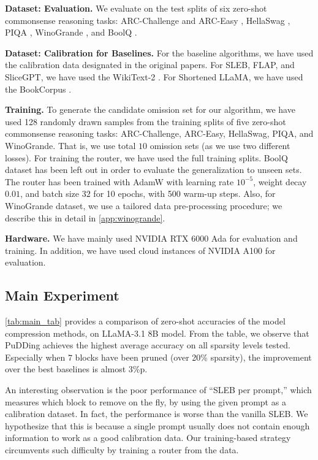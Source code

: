 \textbf{Dataset: Evaluation.} We evaluate on the test splits of six zero-shot commonsense reasoning tasks: ARC-Challenge and ARC-Easy \citep{clark2018arc}, HellaSwag \citep{zellers2019hellaswag}, PIQA \citep{bisk2020piqa}, WinoGrande \citep{sakaguchi2021winogrande}, and BoolQ \citep{clark2019boolq}.

\textbf{Dataset: Calibration for Baselines.} For the baseline algorithms, we have used the calibration data designated in the original papers. For SLEB, FLAP, and SliceGPT, we have used the WikiText-2 \citep{merity2022pointer}. For Shortened LLaMA, we have used the BookCorpus \citep{zhu2015aligning}.

\textbf{Training.} To generate the candidate omission set for our algorithm, we have used 128 randomly drawn samples from the training splits of five zero-shot commonsense reasoning tasks: ARC-Challenge, ARC-Easy, HellaSwag, PIQA, and WinoGrande. That is, we use total $10$ omission sets (as we use two different losses). For training the router, we have used the full training splits. BoolQ dataset has been left out in order to evaluate the generalization to unseen sets. The router has been trained with AdamW with learning rate $10^{-5}$, weight decay $0.01$, and batch size $32$ for 10 epochs, with 500 warm-up steps. Also, for WinoGrande dataset, we use a tailored data pre-processing procedure; we describe this in detail in \cref{app:winogrande}.

\textbf{Hardware.} We have mainly used NVIDIA RTX 6000 Ada for evaluation and training. In addition, we have used cloud instances of NVIDIA A100 for evaluation. %




\subsection{Main Experiment}

\cref{tab:main_tab} provides a comparison of zero-shot accuracies of the model compression methods, on LLaMA-3.1 8B model. From the table, we observe that PuDDing achieves the highest average accuracy on all sparsity levels tested. Especially when $7$ blocks have been pruned (over 20\% sparsity), the improvement over the best baselines is almost 3\%p.

An interesting observation is the poor performance of ``SLEB per prompt,'' which measures which block to remove on the fly, by using the given prompt as a calibration dataset. In fact, the performance is worse than the vanilla SLEB. We hypothesize that this is because a single prompt usually does not contain enough information to work as a good calibration data. Our training-based strategy circumvents such difficulty by training a router from the data.

